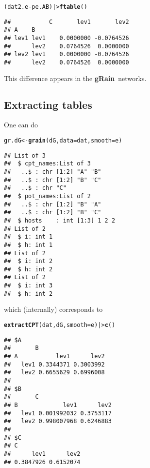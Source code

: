 \documentclass[10pt]{article}\usepackage[]{graphicx}\usepackage[]{xcolor}
\makeatletter
\newcommand{\hlopt}[1]{\textcolor[rgb]{0,0,0}{#1}}%
\newcommand{\hlstd}[1]{\textcolor[rgb]{0.345,0.345,0.345}{#1}}%
\newcommand{\hlkwb}[1]{\textcolor[rgb]{0.69,0.353,0.396}{#1}}%
\newcommand{\hlkwc}[1]{\textcolor[rgb]{0.333,0.667,0.333}{#1}}%
\newcommand{\hlkwd}[1]{\textcolor[rgb]{0.737,0.353,0.396}{\textbf{#1}}}%
\newenvironment{kframe}{%
 \def\at@end@of@kframe{}%
 \ifinner\ifhmode%
  \def\at@end@of@kframe{\end{minipage}}%
  \begin{minipage}{\columnwidth}%
 \fi\fi%
 \def\FrameCommand##1{\hskip\@totalleftmargin \hskip-\fboxsep
 \colorbox{shadecolor}{##1}\hskip-\fboxsep
     \hskip-\linewidth \hskip-\@totalleftmargin \hskip\columnwidth}%
 \MakeFramed {\advance\hsize-\width
   \@totalleftmargin\z@ \linewidth\hsize
   \@setminipage}}%
 {\par\unskip\endMakeFramed%
 \at@end@of@kframe}
\newenvironment{knitrout}{}{} %
\def\grbn{{\bf gRain}}
\makeatother
\begin{document}
\begin{knitrout}
\color{fgcolor}\begin{kframe}
\begin{alltt}
\hlstd{(dat2.e} \hlopt{-} \hlstd{pe.AB)  |>} \hlkwd{ftable}\hlstd{()}
\end{alltt}
\begin{verbatim}
##           C       lev1       lev2
## A    B                           
## lev1 lev1    0.0000000 -0.0764526
##      lev2    0.0764526  0.0000000
## lev2 lev1    0.0000000 -0.0764526
##      lev2    0.0764526  0.0000000
\end{verbatim}
\end{kframe}
\end{knitrout}
This difference appears in the \grbn\ networks.

\subsection{Extracting tables}
\label{sec:extracting-tables}

One can do
\begin{knitrout}
\color{fgcolor}\begin{kframe}
\begin{alltt}
\hlstd{gr.dG} \hlkwb{<-} \hlkwd{grain}\hlstd{(dG,} \hlkwc{data}\hlstd{=dat,} \hlkwc{smooth}\hlstd{=e)}
\end{alltt}
\begin{verbatim}
## List of 3
##  $ cpt_names:List of 3
##   ..$ : chr [1:2] "A" "B"
##   ..$ : chr [1:2] "B" "C"
##   ..$ : chr "C"
##  $ pot_names:List of 2
##   ..$ : chr [1:2] "B" "A"
##   ..$ : chr [1:2] "B" "C"
##  $ hosts    : int [1:3] 1 2 2
## List of 2
##  $ i: int 1
##  $ h: int 1
## List of 2
##  $ i: int 2
##  $ h: int 2
## List of 2
##  $ i: int 3
##  $ h: int 2
\end{verbatim}
\end{kframe}
\end{knitrout}

which (internally) corresponds to
\begin{knitrout}
\color{fgcolor}\begin{kframe}
\begin{alltt}
\hlkwd{extractCPT}\hlstd{(dat, dG,} \hlkwc{smooth}\hlstd{=e)  |>} \hlkwd{c}\hlstd{()}
\end{alltt}
\begin{verbatim}
## $A
##       B
## A           lev1      lev2
##   lev1 0.3344371 0.3003992
##   lev2 0.6655629 0.6996008
## 
## $B
##       C
## B             lev1      lev2
##   lev1 0.001992032 0.3753117
##   lev2 0.998007968 0.6246883
## 
## $C
## C
##      lev1      lev2 
## 0.3847926 0.6152074
\end{verbatim}
\end{kframe}
\end{knitrout}
\end{document}
